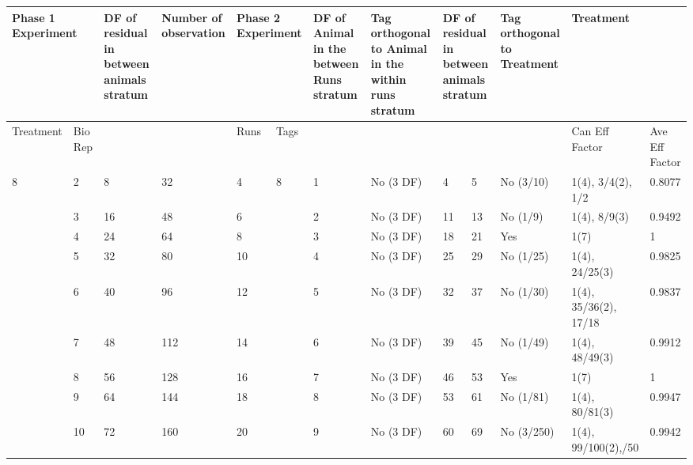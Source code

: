 \begin{tabular}{|p{0.5in}|p{0.3in}|p{0.7in}|p{0.7in}|p{0.3in}|p{0.3in}|p{0.7in}|p{0.7in}|p{0.3in}|p{0.3in}|p{0.6in}|p{0.6in}|p{0.4in}|} \hline 
\multicolumn{2}{|p{1in}|}{Phase 1 Experiment} & DF of residual in between animals stratum & Number of observation  & \multicolumn{2}{|p{0.7in}|}{Phase 2 Experiment} & DF of Animal in the between Runs stratum  & Tag orthogonal to Animal in the within runs stratum & \multicolumn{2}{|p{0.6in}|}{DF of residual in between animals stratum} & Tag orthogonal to Treatment & \multicolumn{2}{|p{1.0in}|}{Treatment} \\ \hline 
Treatment & Bio Rep &  &  & Runs & Tags  &  &  & \multicolumn{2}{|p{0.6in}|}{} &  & Can Eff Factor & Ave Eff Factor \\ \hline 
8 & 2 & 8 & 32 & 4 & 8 & 1 & No (3 DF) & 4 & 5 & No (3/10) & 1(4), 3/4(2), 1/2 & 0.8077 \\ \hline 
 & 3 & 16 & 48 & 6 &  & 2 & No (3 DF) & 11 & 13 & No (1/9) & 1(4), 8/9(3) & 0.9492 \\ \hline 
 & 4 & 24 & 64 & 8 &  & 3 & No (3 DF) & 18 & 21 & Yes & 1(7) & 1 \\ \hline 
 & 5 & 32 & 80 & 10 &  & 4 & No (3 DF) & 25 & 29 & No (1/25) & 1(4), 24/25(3)  & 0.9825 \\ \hline 
 & 6 & 40 & 96 & 12 &  & 5 & No (3 DF) & 32 & 37 & No (1/30) & 1(4), 35/36(2), 17/18 & 0.9837 \\ \hline 
 & 7 & 48 & 112 & 14 &  & 6 & No (3 DF) & 39 & 45 & No (1/49) & 1(4), 48/49(3)  & 0.9912 \\ \hline 
 & 8 & 56 & 128 & 16 &  & 7 & No (3 DF) & 46 & 53 & Yes & 1(7) & 1 \\ \hline 
 & 9 & 64 & 144 & 18 &  & 8 & No (3 DF) & 53 & 61 & No (1/81) & 1(4), 80/81(3) & 0.9947 \\ \hline 
 & 10 & 72 & 160 & 20 &  & 9 & No (3 DF) & 60 & 69 & No (3/250) & 1(4), 99/100(2),\newline 49/50 & 0.9942 \\ \hline 
\end{tabular}



\noindent 


